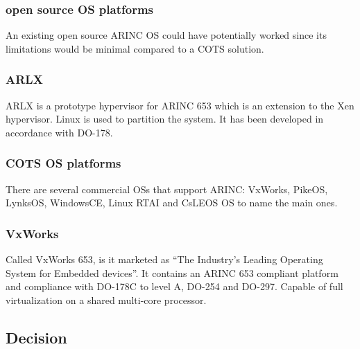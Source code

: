 \subsubsection{open source OS platforms}
An existing open source ARINC OS could have potentially worked since its limitations would be minimal
compared to a COTS solution. %

\subsubsection{ARLX}
ARLX is a prototype hypervisor for ARINC 653 which is an extension to the Xen hypervisor.
Linux is used to partition the system.
It has been developed in accordance with DO-178.

\subsubsection{COTS OS platforms}
There are several commercial OSs that support ARINC:
VxWorks, PikeOS, LynksOS, WindowsCE, Linux RTAI and CsLEOS OS to name the main ones.

\subsubsection{VxWorks}
Called VxWorks 653, is it marketed as ``The Industry's Leading Operating System for Embedded devices''.
It contains an ARINC 653 compliant platform and compliance with DO-178C to level A, DO-254 and DO-297.
Capable of full virtualization on a shared multi-core processor.

\subsection{Decision}

